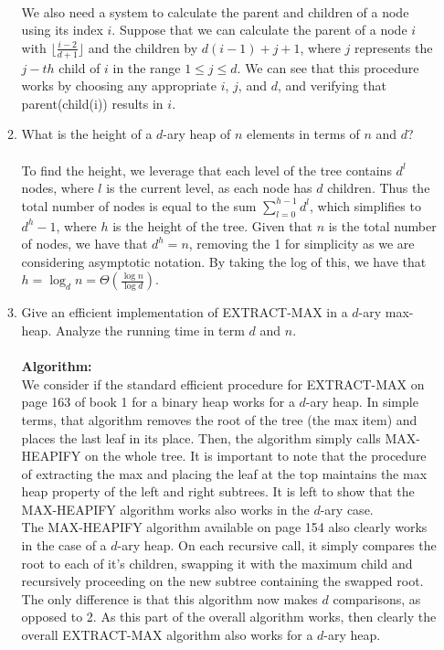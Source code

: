 \documentclass{article}
\begin{document}
\begin{enumerate}
\begin{enumerate}
\\ We also need a system to calculate the parent and children of a node using its index $i$. Suppose that we can calculate the parent of a node $i$ with $\lfloor  \frac{i-2}{d+1} \rfloor$ and the children by $d(i-1)+j+1$, where $j$ represents the $j-th$ child of $i$ in the range $1\leq j \leq d$. We can see that this procedure works by choosing any appropriate $i$, $j$, and $d$, and verifying that parent(child(i)) results in $i$.
		\item What is the height of a $d$-ary heap of $n$ elements in terms of $n$ and $d$?
\\\\ To find the height, we leverage that each level of the tree contains $d^l$ nodes, where $l$ is the current level, as each node has $d$ children. Thus the total number of nodes is equal to the sum $\sum_{l=0}^{h-1}d^l$, which simplifies to $d^h-1$, where $h$ is the height of the tree. Given that $n$ is the total number of nodes, we have that $d^h=n$, removing the 1 for simplicity as we are considering asymptotic notation. By taking the log of this, we have that $h=\log_dn= \Theta(\frac{\log n}{\log d})$.
		\item Give an efficient implementation of EXTRACT-MAX in a $d$-ary max-heap. Analyze the running time in term $d$ and $n$.
\\\\ \textbf{Algorithm:} 
\\ We consider if the standard efficient procedure for EXTRACT-MAX on page 163 of book 1 for a binary heap works for a $d$-ary heap. In simple terms, that algorithm removes the root of the tree (the max item) and places the last leaf in its place. Then, the algorithm simply calls MAX-HEAPIFY on the whole tree. It is important to note that the procedure of extracting the max and placing the leaf at the top maintains the max heap property of the left and right subtrees. It is left to show that the MAX-HEAPIFY algorithm works also works in the $d$-ary case.
\\ The MAX-HEAPIFY algorithm available on page 154 also clearly works in the case of a $d$-ary heap. On each recursive call, it simply compares the root to each of it's children, swapping it with the maximum child and recursively proceeding on the new subtree containing the swapped root. The only difference is that this algorithm now makes $d$ comparisons, as opposed to 2. As this part of the overall algorithm works, then clearly the overall EXTRACT-MAX algorithm also works for a $d$-ary heap.

\end{enumerate}
\end{enumerate}
\end{document}
